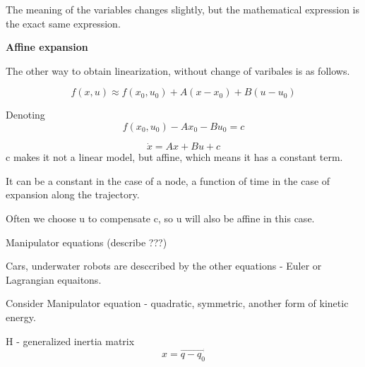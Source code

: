 The meaning of the variables changes slightly, but the mathematical expression is the exact same expression. 


\textbf{Affine expansion}

The other way to obtain linearization, without change of varibales is as follows. 

\[f(x, u) \approx f(x_0, u_0) + A(x-x_0) + B(u-u_0) \]

Denoting \[f(x_0, u_0) - Ax_0 - Bu_0 = c\]

\[\dot x = Ax+ Bu+ c\]
c makes it not a linear model, but affine, which means it has a constant term.

It can be a constant in the case of a node, \omegar a function of time in the case of expansion along the trajectory.


Often we choose u to compensate c, so u will also be affine in this case. 


Manipulator equations (describe ???)


Cars, underwater robots are desccribed by the other equations - Euler or Lagrangian equaitons. 

Consider  Manipulator equation - quadratic, symmetric, another form of kinetic energy. 
\[ \]

H - generalized inertia matrix 
\[x = \vec{q - q_0}\]